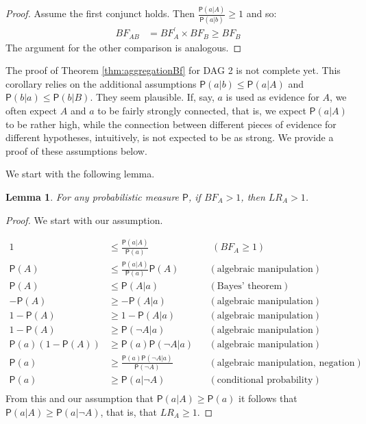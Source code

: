 \documentclass[
  10pt,
  dvipsnames,enabledeprecatedfontcommands]{scrartcl}
\newcommand{\n}{\neg}
\newcommand{\pr}[1]{\ensuremath{\mathsf{P}(#1)}}
\newtheorem{lemma}{Lemma}
\begin{document}
\begin{proof}
Assume the first conjunct holds. Then $\frac{\pr{a\vert A}}{\pr{a\vert b}} \geq 1$ and so:
\begin{align*}
BF_{AB} &= BF^{'}_{A} \times BF_{B} \geq BF_{B}
\end{align*}
\noindent The argument for the other comparison is analogous.
\end{proof}

The proof of Theorem \ref{thm:aggregationBf} for \textsf{DAG 2} is not
complete yet. This corollary relies on the additional assumptions
\(\pr{a\vert b} \leq \pr{a \vert A}\) and
\(\pr{b \vert a} \leq \pr{b\vert B}\). They seem plausible. If, say,
\(a\) is used as evidence for \(A\), we often expect \(A\) and \(a\) to
be fairly strongly connected, that is, we expect \(\pr{a\vert A}\) to be
rather high, while the connection between different pieces of evidence
for different hypotheses, intuitively, is not expected to be as strong.
We provide a proof of these assumptions below.

We start with the following lemma.

\begin{lemma} For any probabilistic measure $\mathsf{P}$, if $BF_A >1$, then $LR_A>1$.\label{lem:BFLR}
\end{lemma}

\begin{proof} We start with our assumption.


\begin{align*}
1 & \leq \frac{\pr{a \vert A}}{\pr{a}} & &  \,\, (BF_A \geq 1) \\
\pr{A} & \leq  \frac{\pr{a \vert A}}{\pr{a}} \pr{A} & & (\mbox{algebraic manipulation}) \\
\pr{A} & \leq \pr{A \vert a} & &  (\mbox{Bayes' theorem})  \\
- \pr{A} &\geq - \pr{A \vert a} &  &   (\mbox{algebraic manipulation}) \\
1- \pr{A} & \geq 1 - \pr{A \vert a} & & (\mbox{algebraic manipulation})\\
1- \pr{A}  & \geq \pr{\n A \vert a} & & (\mbox{algebraic manipulation})\\
\pr{a}\left( 1 - \pr{A}\right) & \geq \pr{a}\pr{\n A \vert a}  & & (\mbox{algebraic manipulation})\\
\pr{a} & \geq \frac{\pr{a} \pr{\n A \vert a}}{\pr{\n A}} &  & (\mbox{algebraic manipulation, negation}) \\
\pr{a} & \geq \pr{a \vert \n A}  & &   (\mbox{conditional probability}) \\
\end{align*}
From this and our assumption  that $\pr{a \vert A} \geq \pr{a}$ it follows that $\pr{a \vert A}\geq \pr{a \vert \n A}$, that is, that \mbox{$LR_A \geq 1$}.
\end{proof}
\end{document}
